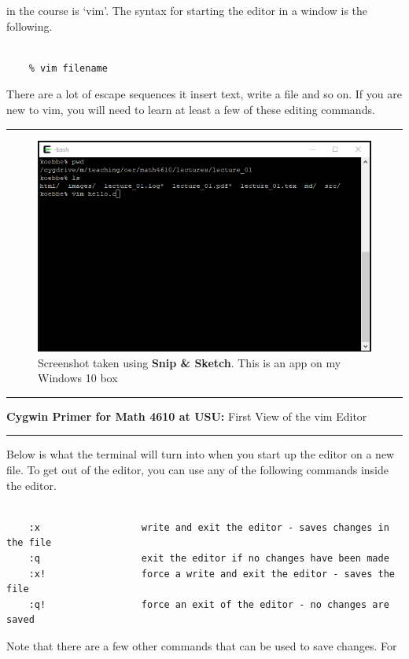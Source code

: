 \documentclass[10pt,fleqn]{article}
\begin{document}
in the course is \lq vim\rq. The syntax for starting the editor in a window is
the following.
\begin{verbatim}

    % vim filename

\end{verbatim}
There are a lot of escape sequences it insert text, write a file and so on. If
you are new to vim, you will need to learn at least a few of these editing
commands.
\vskip0.1in\hrule\vskip0.1in
\vfill
\begin{figure}[h]
\centering
\includegraphics{../images/cygwin_05.png}
\caption{{Screenshot} taken using {\bf Snip \& Sketch}. This is an app on
         my Windows 10 box}
\end{figure}
\eject
\vskip0.1in\hrule\vskip0.1in
\noindent
{{\bf Cygwin Primer for Math 4610 at USU:} First View of the vim Editor} 
\vskip0.1in\hrule\vskip0.1in
\noindent
Below is what the terminal will turn into when you start up the editor on a new
file. To get out of the editor, you can use any of the following commands inside
the editor.
\begin{verbatim}

    :x                  write and exit the editor - saves changes in the file
    :q                  exit the editor if no changes have been made
    :x!                 force a write and exit the editor - saves the file
    :q!                 force an exit of the editor - no changes are saved

\end{verbatim}
Note that there are a few other commands that can be used to save changes. For
\end{document}

